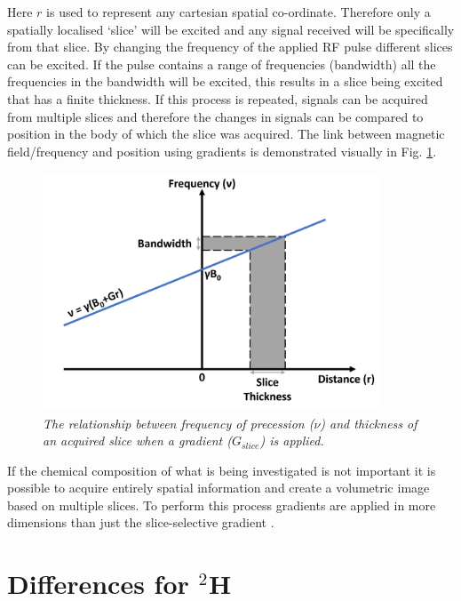 \noindent Here $r$ is used to represent any cartesian spatial co-ordinate. Therefore only a spatially localised `slice' will be excited and any signal received will be specifically from that slice. By changing the frequency of the applied \ac{RF} pulse different slices can be excited. If the pulse contains a range of frequencies (bandwidth) all the frequencies in the bandwidth will be excited, this results in a slice being excited that has a finite thickness. If this process is repeated, signals can be acquired from multiple slices and therefore the changes in signals can be compared to position in the body of which the slice was acquired. The link between magnetic field/frequency and position using gradients is demonstrated visually in Fig. \ref{fig:theory:Grad}.

\begin{figure}
    \centering
    \includegraphics[width=0.9\textwidth]{Figures/Theory/Gradient.png}
    \caption{\textit{The relationship between frequency of precession ($\nu$) and thickness of an acquired slice when a gradient ($G_{slice}$) is applied.}}
    \label{fig:theory:Grad}
\end{figure}

If the chemical composition of what is being investigated is not important it is possible to acquire entirely spatial information and create a volumetric image based on multiple slices. To perform this process gradients are applied in more dimensions than just the slice-selective gradient \cite{deGraaf2019InSpectroscopy}.

\section{Differences for $^2$H}

